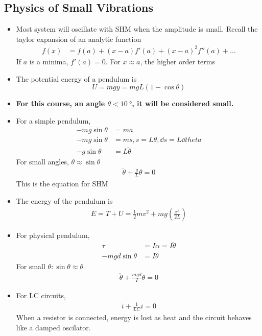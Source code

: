 \documentclass[a4paper]{article}
\numberwithin{equation}{section}
\begin{document}
\subsection{Physics of Small Vibrations}
\begin{itemize}
    \item Most system will oscillate with SHM when the amplitude is small. Recall the taylor expansion of an analytic function
    \begin{align}
        f(x)&=f(a)+(x-a)f'(a)+(x-a)^2f''(a)+\dots
    \end{align}
    If $a$ is a minima, $f'(a)=0$. For $x\approx a$, the higher order terms %
    \item The potential energy of a pendulum is \begin{equation}
        U = mgy=mgL(1-\cos\theta)
    \end{equation}
    \item \textbf{For this course, an angle $\theta<\SI{10}{\degree}$, it will be considered small.}
    \item For a simple pendulum,
    \begin{align}
        -mg\sin\theta&=ma\\
        -mg\sin\theta&=m\ddot s, s=L\theta, \dd s=L\dd theta\\
        -g\sin\theta&=L\ddot\theta
    \end{align}
    For small angles, $\theta\approx\sin\theta$
    \begin{align}
        \ddot\theta+\frac{g}{L}\theta=0
    \end{align}
    This is the equation for SHM
    \item The energy of the pendulum is 
    \begin{align}
        E=T+U=\frac{1}{2}mv^2+mg\left(\frac{x^2}{2L}\right)
    \end{align}
    \item For physical pendulum, 
    \begin{align}
        \tau&=I\alpha=I\ddot\theta\\
        -mgd\sin\theta&=I\ddot\theta
    \end{align}
    For small $\theta:\sin\theta\approx\theta$
    \begin{align}
        \ddot\theta+\frac{mgd}{I}\theta=0
    \end{align}
    \item For LC circuits, 
    \begin{align}
        \ddot i+\frac{1}{LC}i=0
    \end{align}
    When a resistor is connected, energy is lost as heat and the circuit behaves like a damped oscilator.
\end{itemize}
\end{document}
